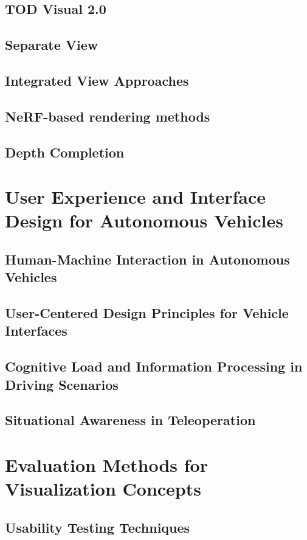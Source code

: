 \subsection{TOD Visual 2.0}
\subsection{Separate View}\label{section:separateview}
\subsection{Integrated View Approaches}\label{section:integratedview}
\subsection{NeRF-based rendering methods}
\subsection{Depth Completion}

\section{User Experience and Interface Design for Autonomous Vehicles}
\subsection{Human-Machine Interaction in Autonomous Vehicles}
\subsection{User-Centered Design Principles for Vehicle Interfaces}
\subsection{Cognitive Load and Information Processing in Driving Scenarios}
\subsection{Situational Awareness in Teleoperation}

\section{Evaluation Methods for Visualization Concepts}
\subsection{Usability Testing Techniques}
